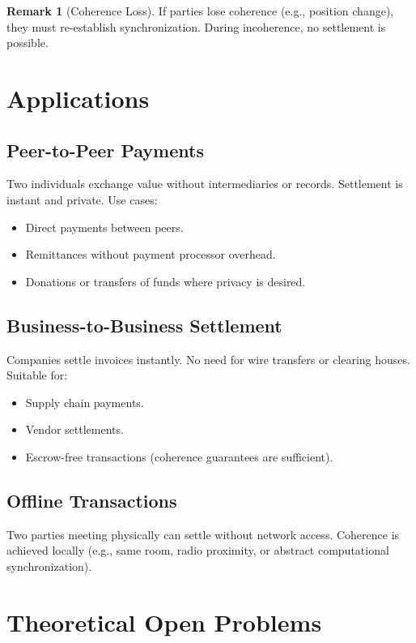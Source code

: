 \documentclass[twocolumn,10pt,a4paper]{article}
\theoremstyle{plain}
\theoremstyle{definition}
\newtheorem{remark}[theorem]{Remark}
\begin{document}
\begin{remark}[Coherence Loss]
If parties lose coherence (e.g., position change), they must re-establish synchronization. During incoherence, no settlement is possible.
\end{remark}

\section{Applications}
\label{sec:applications}

\subsection{Peer-to-Peer Payments}

Two individuals exchange value without intermediaries or records. Settlement is instant and private. Use cases:
\begin{itemize}
\item Direct payments between peers.
\item Remittances without payment processor overhead.
\item Donations or transfers of funds where privacy is desired.
\end{itemize}

\subsection{Business-to-Business Settlement}

Companies settle invoices instantly. No need for wire transfers or clearing houses. Suitable for:
\begin{itemize}
\item Supply chain payments.
\item Vendor settlements.
\item Escrow-free transactions (coherence guarantees are sufficient).
\end{itemize}

\subsection{Offline Transactions}

Two parties meeting physically can settle without network access. Coherence is achieved locally (e.g., same room, radio proximity, or abstract computational synchronization).

\section{Theoretical Open Problems}
\label{sec:open}
\end{document}
